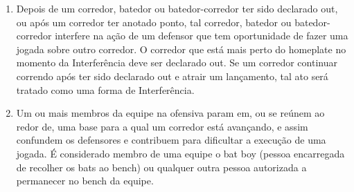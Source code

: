 \begin{multicols}{2}
\begin{enumerate}[label=\alph*)]
\begin{enumerate}[label=\roman*.]
			\item Depois de um corredor, batedor ou batedor-corredor ter sido declarado \gls{out}, ou ap\'os um corredor ter anotado ponto, tal corredor, batedor ou 		batedor-corredor interfere na a\c{c}\~ao de um defensor que tem oportunidade de fazer uma jogada sobre outro corredor. O corredor que est\'a mais perto do \gls{homeplate} no momento da Interfer\^encia deve ser declarado \gls{out}. Se um corredor continuar correndo ap\'os ter sido declarado \gls{out} e atrair um lan\c{c}amento, tal ato ser\'a tratado como uma forma de Interfer\^encia. 
			\item  Um ou mais membros da equipe na ofensiva param em, ou se re\'unem ao redor de, uma base para a qual um corredor est\'a avan\c{c}ando, e assim confundem os defensores e contribuem para dificultar a execu\c{c}\~ao de uma jogada. \'E considerado membro de uma equipe o \gls{bat boy} (pessoa encarregada de recolher os \glspl{bat} ao \gls{bench}) ou qualquer outra pessoa autorizada a permanecer no \gls{bench} da equipe. 
			

\end{enumerate}
\end{enumerate}
\end{multicols}

